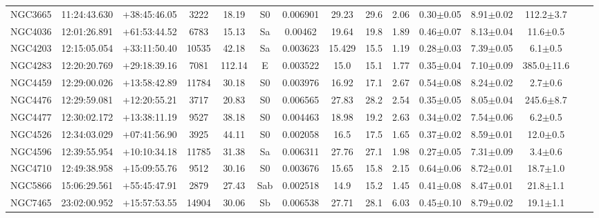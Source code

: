 \documentclass[iop]{emulateapj}
\begin{document}
\begin{table}
\begin{tabular}{lcccccccccccccc}
NGC3665  & 11:24:43.630 & +38:45:46.05 & 3222  & 18.19  & S0  & 0.006901 & 29.23  & 29.6 & 2.06 & 0.30$\pm$0.05 & 8.91$\pm$0.02 & 112.2$\pm$3.7\\
NGC4036  & 12:01:26.891 & +61:53:44.52 & 6783  & 15.13  & Sa  & 0.00462  & 19.64  & 19.8 & 1.89 & 0.46$\pm$0.07 & 8.13$\pm$0.04 & 11.6$\pm$0.5\\
NGC4203  & 12:15:05.054 & +33:11:50.40  & 10535 & 42.18  & Sa  & 0.003623 & 15.429 & 15.5 & 1.19 & 0.28$\pm$0.03 & 7.39$\pm$0.05 & 6.1$\pm$0.5\\
NGC4283  & 12:20:20.769 & +29:18:39.16  & 7081  & 112.14 & E   & 0.003522 & 15.0   & 15.1 & 1.77 & 0.35$\pm$0.04 & 7.10$\pm$0.09 & 385.0$\pm$11.6\\
NGC4459  & 12:29:00.026 & +13:58:42.89  & 11784 & 30.18  & S0  & 0.003976 & 16.92  & 17.1 & 2.67 & 0.54$\pm$0.08 & 8.24$\pm$0.02 & 2.7$\pm$0.6\\
NGC4476  & 12:29:59.081 & +12:20:55.21  & 3717  & 20.83  & S0  & 0.006565 & 27.83  & 28.2 & 2.54 & 0.35$\pm$0.05 & 8.05$\pm$0.04 & 245.6$\pm$8.7\\
NGC4477  & 12:30:02.172 & +13:38:11.19  & 9527  & 38.18  & S0  & 0.004463 & 18.98  & 19.2 & 2.63 & 0.34$\pm$0.02 & 7.54$\pm$0.06 & 6.2$\pm$0.5\\
NGC4526  & 12:34:03.029 & +07:41:56.90 & 3925  & 44.11  & S0  & 0.002058 & 16.5   & 17.5 & 1.65 & 0.37$\pm$0.02 & 8.59$\pm$0.01 & 12.0$\pm$0.5\\
NGC4596  & 12:39:55.954 & +10:10:34.18 & 11785 & 31.38  & Sa  & 0.006311 & 27.76  & 27.1 & 1.98 & 0.27$\pm$0.05 & 7.31$\pm$0.09 & 3.4$\pm$0.6\\
NGC4710  & 12:49:38.958 & +15:09:55.76 & 9512  & 30.16  & S0  & 0.003676 & 15.65  & 15.8 & 2.15 & 0.64$\pm$0.06 & 8.72$\pm$0.01 & 18.7$\pm$1.0\\
NGC5866  & 15:06:29.561 & +55:45:47.91 & 2879  & 27.43  & Sab & 0.002518 & 14.9   & 15.2 & 1.45 & 0.41$\pm$0.08 & 8.47$\pm$0.01 & 21.8$\pm$1.1\\
NGC7465  & 23:02:00.952 & +15:57:53.55 & 14904 & 30.06  & Sb  & 0.006538 & 27.71  & 28.1 & 6.03 & 0.45$\pm$0.10 & 8.79$\pm$0.02 & 19.1$\pm$1.1\\
\hline
\end{tabular}
\end{table}
\end{document}
